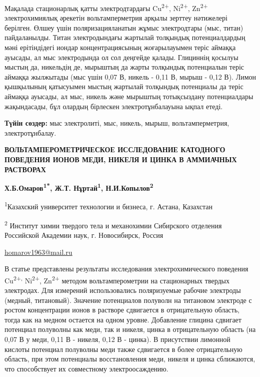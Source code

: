 Мақалада стационарлық қатты электродтардағы Cu\textsuperscript{2+},
Ni\textsuperscript{2+}, Zn\textsuperscript{2+} электрохимиялық әрекетін
вольтамперметрия арқылы зерттеу нәтижелері берілген. Өлшеу үшін
поляризацияланатын жұмыс электродтары (мыс, титан) пайдаланылды. Титан
электродындағы жартылай толқындық потенциалдардың мәні ерітіндідегі
иондар концентрациясының жоғарылауымен теріс аймаққа ауысады, ал мыс
электродында ол сол деңгейде қалады. Глициннің қосылуы мыстың да,
никельдің де, мырыштың да жарты толқындық потенциалын теріс аймаққа
жылжытады (мыс үшін 0,07 В, никель - 0,11 В, мырыш - 0,12 В). Лимон
қышқылының қатысуымен мыстың жартылай толқындық потенциалы да теріс
аймаққа ауысады, ал мыс, никель және мырыштың тотықсыздану потенциалдары
жақындасады, бұл олардың бірлескен электротұнбалауына ықпал етеді.

{\bfseries Түйін сөздер:} мыс электролиті, мыс, никель, мырыш,
вольтамперметрия, электротұнбалау.

\begin{center}
{\large\bfseries ВОЛЬТАМПЕРОМЕТРИЧЕСКОЕ ИССЛЕДОВАНИЕ КАТОДНОГО ПОВЕДЕНИЯ ИОНОВ
МЕДИ, НИКЕЛЯ И ЦИНКА В АММИАЧНЫХ РАСТВОРАХ}

{\bfseries Х.Б.Омаров\textsuperscript{1*}, Ж.Т. Нұртай\textsuperscript{1},
Н.И.Копылов\textsuperscript{2}}

\textsuperscript{1}Казахский университет технологии и бизнеса, г.
Астана, Казахстан

\textsuperscript{2} Институт химии твердого тела и механохимии
Сибирского отделения Российской Академии наук, г. Новосибирск, Россия

\href{mailto:homarov1963@mail.ru}{\ul{homarov1963@mail.ru}}
\end{center}

В статье представлены результаты исследования электрохимического
поведения Cu\textsuperscript{2+,} Ni\textsuperscript{2+},
Zn\textsuperscript{2+} методом вольтамперометрии на стационарных твердых
электродах. Для измерений использовались поляризуемые рабочие электроды
(медный, титановый). Значение потенциалов полуволн на титановом
электроде с ростом концентрации ионов в растворе сдвигается в
отрицательную область, тогда как на медном остается на одном уровне.
Добавление глицина сдвигает потенциал полуволны как меди, так и никеля,
цинка в отрицательную область (на 0,07 В у меди, 0,11 В - никеля, 0,12 В
- цинка). В присутствии лимонной кислоты потенциал полуволны меди также
сдвигается в более отрицательную область, при этом потенциалы
восстановления меди, никеля и цинка сближаются, что способствует их
совместному электроосаждению.

